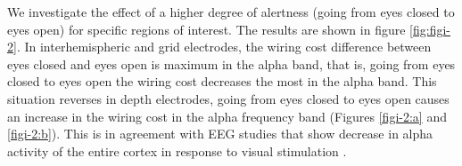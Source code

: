 \documentclass[11pt, onecolumn]{article}
\begin{document}
We investigate the effect of a higher degree of alertness (going from eyes closed to eyes open) for specific regions of interest. The results are shown in figure \ref{fig:figi-2}. In interhemispheric and grid electrodes, the wiring cost difference between eyes closed and eyes open is maximum in the alpha band, that is, going from eyes closed to eyes open the wiring cost decreases the most in the alpha band. 
This situation reverses in depth electrodes, going from eyes closed to eyes open causes an increase in the wiring cost in the alpha frequency band (Figures \ref{figi-2:a} and \ref{figi-2:b}). This is in agreement with EEG studies that show decrease in alpha activity of the entire cortex in response to visual stimulation \citep{barry2007eeg}.


 
\end{document}
